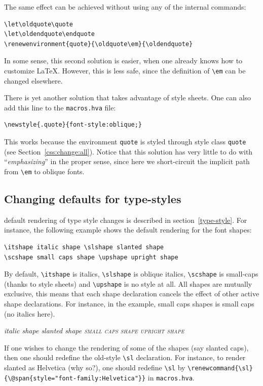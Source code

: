The same effect can be achieved without using any of the internal
commands:
\begin{verbatim}
\let\oldquote\quote
\let\oldendquote\endquote
\renewenvironment{quote}{\oldquote\em}{\oldendquote}
\end{verbatim}
In some sense, this second 
solution is easier, when one already knows
how to customize \LaTeX{}. However, this is less safe, since the definition of
\verb+\em+ can be changed elsewhere.

There is yet another solution that takes advantage of style sheets.
One can also add this line to the \texttt{macros.hva} file:
\begin{verbatim}
\newstyle{.quote}{font-style:oblique;}
\end{verbatim}
This works because the environment \texttt{quote} is styled through
style class \texttt{quote} (see Section~\ref{css:change:all}).
Notice that this solution has very little to do with
``\emph{emphasizing}'' in the proper sense, since here we
short-circuit the implicit path from \verb+\em+ to oblique fonts.


\subsection{Changing defaults for type-styles}\label{customize-style}
\hevea{} default rendering of type style changes is described in
section~\ref{type-style}.
For instance, the following example shows the default rendering
for the font shapes:
\begin{verbatim}
\itshape italic shape \slshape slanted shape
\scshape small caps shape \upshape upright shape
\end{verbatim}
By default, \verb+\itshape+ is italics, \verb+\slshape+ is oblique
italics, \verb+\scshape+ is small-caps (thanks to style sheets) and \verb+\upshape+ is no style at all.
All shapes are mutually exclusive, this means that each shape
declaration cancels the effect of other active shape declarations.
For instance, in the example, small caps shapes is small caps (no italics here).
\begin{htmlonly}
\begin{htmlout}
\itshape italic shape \slshape slanted shape
\scshape small caps shape \upshape upright shape
\end{htmlout}
\end{htmlonly}

If one wishes to change the rendering of some of the shapes (say slanted
caps), then one should redefine the old-style \verb+\sl+ declaration.
For instance, to render slanted as Helvetica (why so?), one should
redefine \verb+\sl+ by \verb+\renewcommand{\sl}{\@span{style="font-family:Helvetica"}}+ in
\texttt{macros.hva}.


